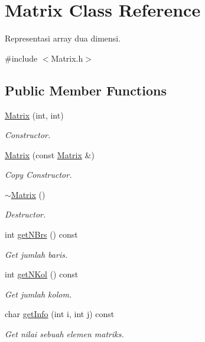 \hypertarget{class_matrix}{}\section{Matrix Class Reference}
\label{class_matrix}


Representasi array dua dimensi.  




{\ttfamily \#include $<$Matrix.\+h$>$}

\subsection*{Public Member Functions}
\begin{DoxyCompactItemize}
\item 
\hyperlink{class_matrix_adfbeb67cc3c43d96c53f881d79f919cb}{Matrix} (int, int)
\begin{DoxyCompactList}\small\item\em Constructor. \end{DoxyCompactList}\item 
\hyperlink{class_matrix_a0b9cfa2302a0273afb1b26e501f93abc}{Matrix} (const \hyperlink{class_matrix}{Matrix} \&)
\begin{DoxyCompactList}\small\item\em Copy Constructor. \end{DoxyCompactList}\item 
\hyperlink{class_matrix_a9b1c3627f573d78a2f08623fdfef990f}{$\sim$\+Matrix} ()
\begin{DoxyCompactList}\small\item\em Destructor. \end{DoxyCompactList}\item 
int \hyperlink{class_matrix_a518609c744a502753d79063d75075312}{get\+N\+Brs} () const 
\begin{DoxyCompactList}\small\item\em Get jumlah baris. \end{DoxyCompactList}\item 
int \hyperlink{class_matrix_a9d540e5e85c41e7852308b1000a04ecd}{get\+N\+Kol} () const 
\begin{DoxyCompactList}\small\item\em Get jumlah kolom. \end{DoxyCompactList}\item 
char \hyperlink{class_matrix_a58e92d242a032a24ebbbfb235093edd9}{get\+Info} (int i, int j) const 
\begin{DoxyCompactList}\small\item\em Get nilai sebuah elemen matriks. \end{DoxyCompactList}\item 

\end{DoxyCompactItemize}
